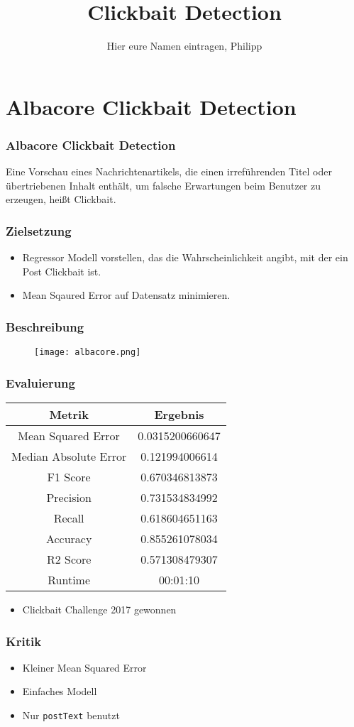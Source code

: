 \documentclass{beamer}
\author{Hier eure Namen eintragen, Philipp}
\title{Clickbait Detection}
\begin{document}
\newcommand{\pro}[1]{\item[\colorbox{green}{\textcolor{white}{\makebox(5.5,7){\textbf{+}}}}] #1}
\newcommand{\con}[1]{\item[\colorbox{red}{\textcolor{white}{\makebox(5.5,7){\textbf{--}}}}] #1}
\begin{frame}
\titlepage
\end{frame}

\section{Albacore Clickbait Detection}
\begin{frame}
\frametitle{Albacore Clickbait Detection}
    \begin{definition}
	Eine Vorschau eines Nachrichtenartikels, die einen irreführenden Titel oder übertriebenen Inhalt enthält, um falsche Erwartungen 
	beim Benutzer zu erzeugen, heißt Clickbait.
	\end{definition}
\end{frame}
\begin{frame}
    \frametitle{Zielsetzung}
	\begin{itemize}    
	\item Regressor Modell vorstellen, das die Wahrscheinlichkeit angibt, mit der ein Post Clickbait ist.
	\item Mean Sqaured Error auf Datensatz minimieren.
	\end{itemize}
\end{frame}
\begin{frame}
    \frametitle{Beschreibung}
    \begin{figure}
  	\texttt{[image: albacore.png]}
\end{figure}
\end{frame}
\begin{frame}
    \frametitle{Evaluierung}
    \center
    \begin{tabular}{c|c}
    Metrik & Ergebnis \\ \hline 
    Mean Squared Error & 0.0315200660647 \\
	Median Absolute Error & 0.121994006614 \\
	F1 Score & 0.670346813873 \\
	Precision & 0.731534834992 \\
	Recall & 0.618604651163 \\
	Accuracy & 0.855261078034 \\
	R2 Score & 0.571308479307 \\
	Runtime & 00:01:10 \\
    \end{tabular}
	
	\begin{itemize}
	\item Clickbait Challenge 2017 gewonnen
	\end{itemize}
\end{frame}
\begin{frame}
    \frametitle{Kritik}
    \begin{itemize}
	\pro{Kleiner Mean Squared Error}
	\pro{Einfaches Modell}
	\con{Nur \texttt{postText} benutzt}
	\end{itemize}
\end{frame}
\end{document}
